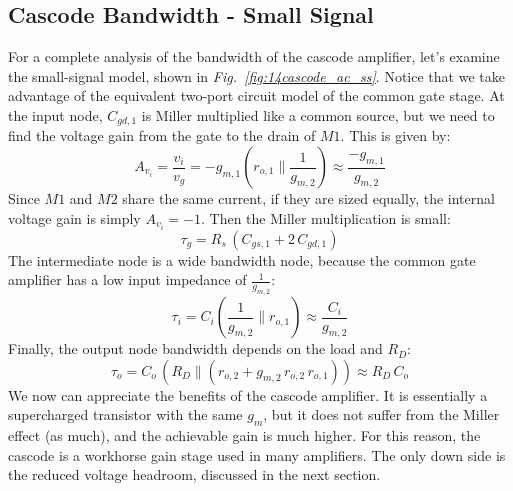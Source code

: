 \subsection{Cascode Bandwidth - Small Signal}
For a complete analysis of the bandwidth of the cascode amplifier, let's examine the small-signal model, shown in \emph{Fig.~\ref{fig:14cascode_ac_ss}}.  Notice that we take advantage of the equivalent two-port circuit model of the common gate stage.   At the input node, $C_{gd,1}$ is Miller multiplied like a common source, but we need to find the voltage gain from the gate to the drain of $M1$.  This is given by:
    \begin{equation}
        A_{v_i} = \frac{v_i}{v_g} = -g_{m,1} \left( r_{o,1} \parallel \frac{1}{g_{m,2}} \right) \approx \frac{-g_{m,1}}{g_{m,2}}
    \end{equation}
Since $M1$ and $M2$ share the same current, if they are sized equally, the internal voltage gain is simply $A_{v_i} = -1$.  Then the Miller multiplication is small:
    \begin{equation}
        \tau_g = R_s\,(C_{gs,1} + 2\,C_{gd,1})
    \end{equation}
The intermediate node is a wide bandwidth node, because the common gate amplifier has a low input impedance of $\frac{1}{g_{m,2}}$:
    \begin{equation}
        \tau_i = C_i\left(\frac{1}{g_{m,2}} \parallel r_{o,1}\right) \approx \frac{C_i}{g_{m,2}}
    \end{equation}  
Finally, the output node bandwidth depends on the load and $R_D$:
    \begin{equation}
        \tau_o = C_o\,(R_D \parallel (r_{o,2} + g_{m,2}\,r_{o,2}\,r_{o,1})) \approx R_D\,C_o
    \end{equation}
We now can appreciate the benefits of the cascode amplifier.  It is essentially a supercharged transistor with the same $g_m$, but it does not suffer from the Miller effect (as much), and the achievable gain is much higher.  For this reason, the cascode is a workhorse gain stage used in many amplifiers.  The only down side is the reduced voltage headroom, discussed in the next section.
\newpage
